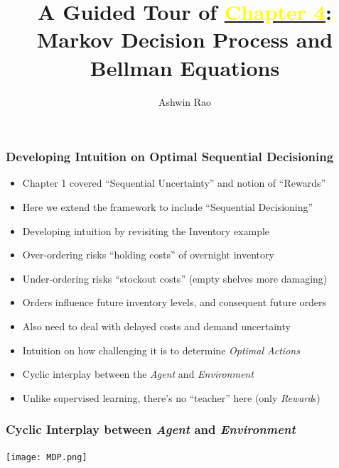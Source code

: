 \documentclass[handout]{beamer}
\title[MDP Chapter]{A Guided Tour of \href{http://stanford.edu/~ashlearn/RLForFinanceBook/book.pdf}{\underline{\textcolor{yellow}{Chapter 4}}}: \\  Markov Decision Process and Bellman Equations} %
\author{Ashwin Rao} %
\institute[Stanford] %
{ICME, Stanford University
}
\date %
\begin{document}
\lstset{language=Python}  
\begin{frame}
\titlepage %
\end{frame}


\begin{frame}
\frametitle{Developing Intuition on Optimal Sequential Decisioning}
\pause
\begin{itemize}[<+->]
\item Chapter 1 covered ``Sequential Uncertainty'' and notion of ``Rewards''
\item Here we extend the framework to include ``Sequential Decisioning''
\item Developing intuition by revisiting the Inventory example
\item Over-ordering risks ``holding costs'' of overnight inventory
\item Under-ordering risks ``stockout costs'' (empty shelves more damaging)
\item Orders influence future inventory levels, and consequent future orders
\item Also need to deal with delayed costs and demand uncertainty
\item Intuition on how challenging it is to determine {\em Optimal Actions}
\item Cyclic interplay between the {\em Agent} and {\em Environment}
\item Unlike supervised learning, there's no ``teacher'' here (only {\em Reward}s)
\end{itemize}
\end{frame}


\begin{frame}
\frametitle{Cyclic Interplay between {\em Agent} and {\em Environment}}
\texttt{[image: MDP.png]}
\end{frame}
\end{document}
